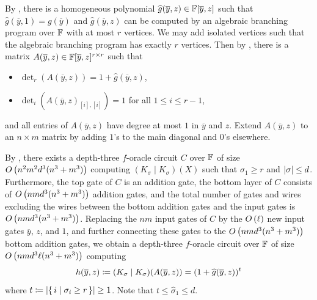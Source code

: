 \documentclass[letterpaper, 11pt]{amsart}
\newif\iffull
\begin{document}
\iffull
\clearpage
\fi

\iffull
\begin{pf}
    By , there is a homogeneous polynomial $\widehat{g}(\overline{y}, z) \in \mathbb{F}[\overline{y}, z]$ such that $\widehat{g}(\overline{y}, 1) = g(\overline{y})$ and $\widehat{g}(\overline{y}, z)$ can be computed by an algebraic branching program over $\mathbb{F}$ with at most $r$ vertices.
    We may add isolated vertices such that the algebraic branching program has exactly $r$ vertices.
    Then by , there is a matrix $A(\overline{y}, z) \in \mathbb{F}[\overline{y}, z]^{r \times r}$  such that
    \begin{itemize}
        \item $\det_r(A(\overline{y}, z)) = 1 + \widehat{g}(\overline{y}, z)$,
        \item $\det_i(A(\overline{y}, z)_{[i], [i]}) = 1$ for all $1 \leq i \leq r - 1$,
    \end{itemize}
    and all entries of $A(\overline{y}, z)$ have degree at most $1$ in $\overline{y}$ and $z$.
    Extend $A(\overline{y}, z)$ to an $n\times m$ matrix by adding $1$'s to the main diagonal and $0$'s elsewhere.

   By , there exists a depth-three $f$-oracle circuit $C$ over $\mathbb{F}$ of size $O\kern-0.0pt\left(n^2m^2d^3(n^3+m^3)\right)$ computing $(K_\sigma \mid K_\sigma)(X)$ such that $\sigma_1 \geq r$ and $\abs{\sigma} \leq d$.
   Furthermore, the top gate of $C$ is an addition gate, the bottom layer of $C$ consists of $O\kern-0.0pt\left(nmd^3(n^3+m^3)\right)$ addition gates, and the total number of gates and wires excluding the wires between the bottom addition gates and the input gates is $O\kern-0.0pt\left(nmd^3(n^3+m^3)\right)$.
   Replacing the $nm$ input gates of $C$ by the $O\kern-0.0pt\left(\ell\right)$ new input gates $\overline{y}$, $z$, and $1$, and further connecting these gates to the $O\kern-0.0pt\left(nmd^3(n^3+m^3)\right)$ bottom addition gates, we obtain a depth-three $f$-oracle circuit over $\mathbb{F}$ of size $O\kern-0.0pt\left(nmd^3\ell(n^3+m^3)\right)$ computing
    \[
        h(\overline{y}, z) \coloneqq(K_\sigma \mid K_\sigma)(A(\overline{y}, z)) = (1 + \widehat{g}(\overline{y}, z))^t
    \]
    where $t \coloneqq \abs{\set{i \mid \sigma_i \geq r}} \geq 1$.
    Note that $t \leq \widehat{\sigma}_1 \leq d$.


\end{pf}
\end{document}
